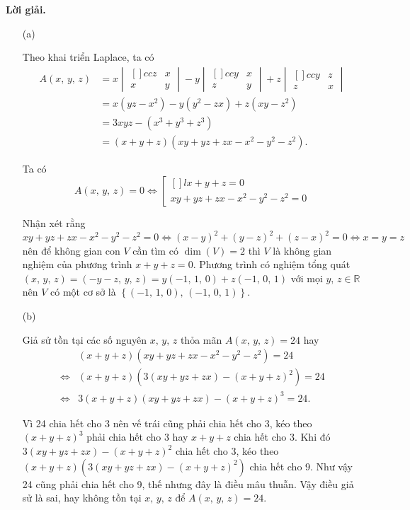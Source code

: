 \textbf{Lời giải. }

\begin{enumerate}
    \item[(a)] {Theo khai triển Laplace, ta có 
    \begin{align*}
        A(x,\,y,\,z) 
        & = x\begin{vmatrix}[]{cc}
            z & x \\
            x & y
        \end{vmatrix} - y\begin{vmatrix}[]{cc}
            y & x \\
            z & y
        \end{vmatrix} + z\begin{vmatrix}[]{cc}
            y & z \\
            z & x
        \end{vmatrix} \\
        & = x(yz - x^2) - y(y^2 - zx) + z(xy - z^2) \\
        & = 3xyz - (x^3+y^3+z^3) \\
        & = (x + y + z)(xy + yz + zx - x^2 - y^2 - z^2).
    \end{align*}

    Ta có $$A(x,\,y,\,z) = 0 \iff \left[\begin{matrix}[]{l}
        x + y + z = 0 \\ xy + yz + zx - x^2 - y^2 - z^2 = 0
    \end{matrix} \right.$$

    Nhận xét rằng $xy + yz + zx - x^2 - y^2 - z^2 = 0\iff (x-y)^2 + (y-z)^2 + (z-x)^2 = 0 \iff x = y = z$ nên để không gian con $V$ cần tìm có $\dim(V) = 2$ thì $V$ là không gian nghiệm của phương trình $x + y + z = 0$. Phương trình có nghiệm tổng quát $(x,\,y,\,z) = (-y-z,\,y,\,z) = y(-1,\,1,\,0) + z(-1,\,0,\,1)$ với mọi $y,\,z \in \mathbb{R}$ nên $V$ có một cơ sở là $\left\{(-1,\,1,\,0),\,(-1,\,0,\,1)\right\}$.
    }
    \item[(b)] {Giả sử tồn tại các số nguyên $x,\,y,\,z$ thỏa mãn $A(x,\,y,\,z) = 24$ hay 
    \begin{align*}
        & (x + y + z)(xy + yz + zx - x^2 - y^2 - z^2) = 24 \\
        \iff & (x + y + z)\left(3(xy+yz+zx) - (x+y+z)^2\right) = 24 \\
        \iff & 3(x+y+z)(xy+yz+zx) - (x+y+z)^3 = 24.
    \end{align*}

    Vì 24 chia hết cho 3 nên vế trái cũng phải chia hết cho 3, kéo theo $(x+y+z)^3$ phải chia hết cho 3 hay $x+y+z$ chia hết cho 3. Khi đó $3(xy+yz+zx)-(x+y+z)^2$ chia hết cho 3, kéo theo $(x + y + z)\left(3(xy+yz+zx) - (x+y+z)^2\right)$ chia hết cho 9. Như vậy 24 cũng phải chia hết cho 9, thế nhưng đây là điều mâu thuẫn. Vậy điều giả sử là sai, hay không tồn tại $x,\,y,\,z$ để $A(x,\,y,\,z) = 24$.
    }
\end{enumerate}

